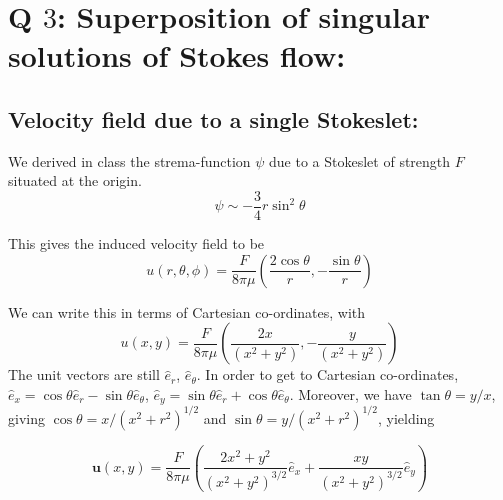 \documentclass{article}
\begin{document}
\section{Q $3$: Superposition of singular solutions of Stokes flow: }
\subsection*{Velocity field due to a single Stokeslet:}
We derived in class the strema-function $\psi$ due to a Stokeslet of strength $F$ situated at the origin. 
\begin{equation}\label{eq:psi_stokeslet}
 \psi \sim -\frac{3}{4} r \sin^{2}{\theta}
\end{equation}

This gives the induced velocity field to be 
\begin{equation}\label{eq:velo_stokeslet}
 u(r, \theta, \phi) = \frac{F}{8\pi\mu}\left(\frac{2\cos{\theta}}{r}, -\frac{\sin{\theta}}{r}\right)
\end{equation}

We can write this in terms of Cartesian co-ordinates, with 
\begin{equation}\label{eq:velo_stokeslet_2}
 u(x, y) = \frac{F}{8\pi\mu}\left(\frac{2x}{(x^{2}+y^{2})}, -\frac{y}{(x^{2}+y^{2})}\right)
\end{equation}
The unit vectors are still $\hat{e}_{r}$, $\hat{e}_{\theta}$. In order to get to Cartesian co-ordinates, $\hat{e}_{x} = \cos{\theta}\hat{e}_{r} - \sin{\theta}\hat{e}_{\theta}$, $\hat{e}_{y} = \sin{\theta}\hat{e}_{r} + \cos{\theta}\hat{e}_{\theta}$. Moreover, we have $\tan{\theta} = y/x$, giving $\cos{\theta} = x/(x^{2}+r^{2})^{1/2}$ and $\sin{\theta} = y/(x^{2}+r^{2})^{1/2}$, yielding

\begin{equation}\label{eq:u_stokeslet_cartesian}
 \boldsymbol{u}(x, y) = \frac{F}{8\pi\mu}\left(\frac{2x^{2}+y^{2}}{(x^{2}+y^{2})^{3/2}} \hat{e}_{x} + \frac{xy}{(x^{2}+y^{2})^{3/2}} \hat{e}_{y} \right)
\end{equation}
\end{document}
